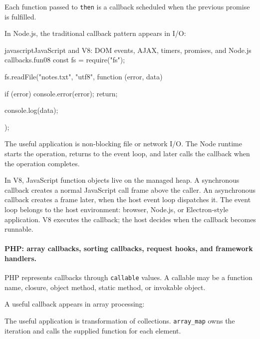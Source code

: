 Each function passed to \texttt{then} is a callback scheduled when the previous promise is fulfilled.

In Node.js, the traditional callback pattern appears in I/O:

\begin{codebox}[]{javascript}{JavaScript and V8: DOM events, AJAX, timers, promises, and Node.js callbacks.}{fun08}
const fs = require("fs");

fs.readFile("notes.txt", "utf8", function (error, data) {
    if (error) {
        console.error(error);
        return;
    }

    console.log(data);
});
\end{codebox}


The useful application is non-blocking file or network I/O. The Node runtime starts the operation, returns to the event loop, and later calls the callback when the operation completes.

In V8, JavaScript function objects live on the managed heap. A synchronous callback creates a normal JavaScript call frame above the caller. An asynchronous callback creates a frame later, when the host event loop dispatches it. The event loop belongs to the host environment: browser, Node.js, or Electron-style application. V8 executes the callback; the host decides when the callback becomes runnable.

\paragraph{PHP: array callbacks, sorting callbacks, request hooks, and framework handlers.}

PHP represents callbacks through \texttt{callable} values. A callable may be a function name, closure, object method, static method, or invokable object.

A useful callback appears in array processing:



The useful application is transformation of collections. \texttt{array\_map} owns the iteration and calls the supplied function for each element.

